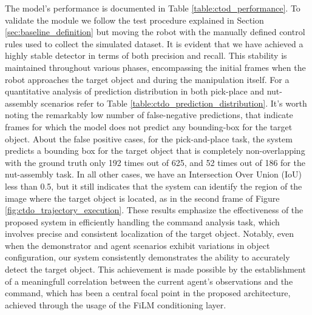 The model's performance is documented in Table \ref{table:ctod_performance}. To validate the module we follow the test procedure explained in Section \ref{sec:baseline_definition} but moving the robot with the manually defined control rules used to collect the simulated dataset. It is evident that we have achieved a highly stable detector in terms of both precision and recall. This stability is maintained throughout various phases, encompassing the initial frames when the robot approaches the target object and during the manipulation itself. For a quantitative analysis of prediction distribution in both pick-place and nut-assembly scenarios refer to Table \ref{table:ctdo_prediction_distribution}. It's worth noting the remarkably low number of false-negative predictions, that indicate frames for which the model does not predict any bounding-box for the target object. About the false positive cases, for the pick-and-place task, the system predicts a bounding box for the target object that is completely non-overlapping with the ground truth only 192 times out of 625, and 52 times out of 186 for the nut-assembly task. In all other cases, we have an Intersection Over Union (IoU) less than 0.5, but it still indicates that the system can identify the region of the image where the target object is located, as in the second frame of Figure \ref{fig:ctdo_trajectory_execution}. These results emphasize the effectiveness of the proposed system in efficiently handling the command analysis task, which involves precise and consistent localization of the target object. Notably, even when the demonstrator and agent scenarios exhibit variations in object configuration, our system consistently demonstrates the ability to accurately detect the target object. This achievement is made possible by the establishment of a meaningfull correlation between the current agent's observations and the command, which has been a central focal point in the proposed architecture, achieved through the usage of the FiLM conditioning layer.


